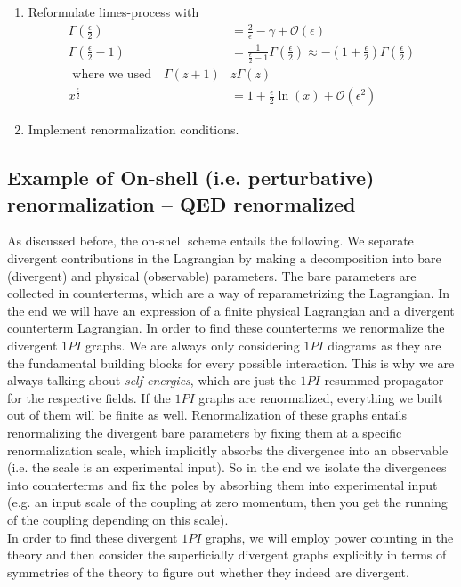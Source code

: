 \begin{enumerate}
	\item Reformulate limes-process with
	\begin{align}
		\Gamma(\frac{\epsilon}{2}) &= \frac{2}{\epsilon} - \gamma + \mathcal{O}(\epsilon) \\
		\Gamma(\frac{\epsilon}{2} -1) &= \frac{1}{\frac{\epsilon}{2}-1} \Gamma(\frac{\epsilon}{2}) \approx - (1+\frac{\epsilon}{2}) \Gamma(\frac{\epsilon}{2}) \\
		\text{ where we used} \quad \Gamma(z+1) &z \Gamma(z) \nonumber\\
		x^{\frac{\epsilon}{2}} &= 1 + \frac{\epsilon}{2} \ln(x)+ \mathcal{O}(\epsilon^2)
	\end{align}
\item Implement renormalization conditions.
\end{enumerate}



\subsection{Example of  On-shell (i.e. perturbative) renormalization -- QED renormalized}
\label{subsec:renormalizationqed}
As discussed before, the on-shell scheme entails the following. We separate divergent contributions in the Lagrangian by making a decomposition into bare (divergent) and physical (observable) parameters. The bare parameters are collected in counterterms, which are a way of reparametrizing the Lagrangian. In the end we will have an expression of a finite physical Lagrangian and a divergent counterterm Lagrangian. In order to find these counterterms we renormalize the divergent $1PI$ graphs. We are always only considering $1PI$ diagrams as they are the fundamental building blocks for every possible interaction. This is why we are always talking about \emph{self-energies}, which are just the $1PI$ resummed propagator for the respective fields. If the $1PI$ graphs are renormalized, everything we built out of them will be finite as well. Renormalization of these graphs entails renormalizing the divergent bare parameters by fixing them at a specific renormalization scale, which implicitly absorbs the divergence into an observable (i.e. the scale is an experimental input). So in the end we isolate the divergences into counterterms and fix the poles by absorbing them into experimental input (e.g. an input scale of the coupling at zero momentum, then you get the running of the coupling depending on this scale). \\
In order to find these divergent $1PI$ graphs, we will employ power counting in the theory and then consider the superficially divergent graphs explicitly in terms of symmetries of the theory to figure out whether they indeed are divergent.
